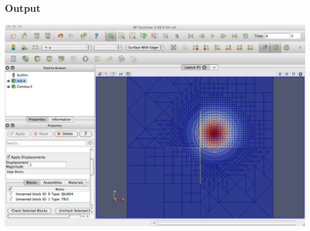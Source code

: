 \frame
{
  \Large
  \begin{block}{}
  \end{block}
}


\frame
{
  \frametitle{Output}
  \begin{center}
    \includegraphics[height=0.8\textheight]{tutorial/transient_convection_diffusion_AMR/screen}
  \end{center}
} 


